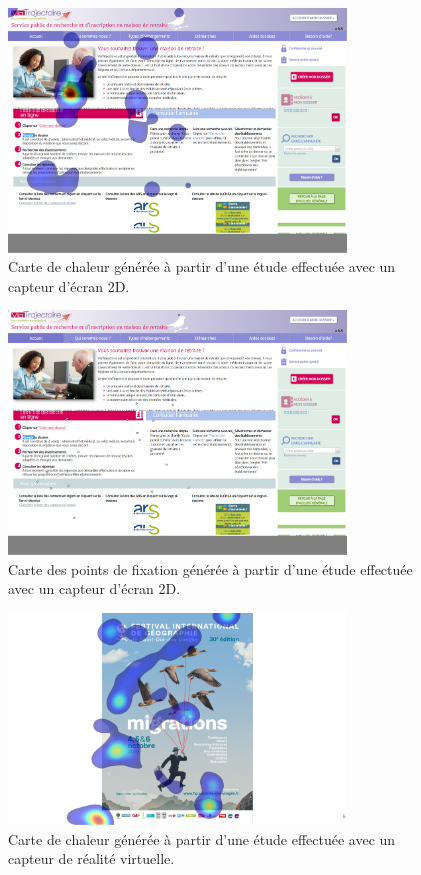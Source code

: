 \documentclass[hidelinks,12pt]{article}
\begin{document}
\begin{figure}[htpb]
  \centering
  \includegraphics[width=0.8\textwidth,keepaspectratio=true]{tea-heatmap-9.png}
  \caption{Carte de chaleur générée à partir d'une étude effectuée avec un
    capteur d'écran 2D.}
  \label{fig:tea-resultats-heatmap}
\end{figure}

\begin{figure}[htpb]
  \centering
  \includegraphics[width=0.8\textwidth,keepaspectratio=true]{tea-raw-9.png}
  \caption{Carte des points de fixation générée à partir d'une étude effectuée
    avec un capteur d'écran 2D.}
  \label{fig:tea-resultats-raw}
\end{figure}

\begin{figure}[htpb]
  \centering
  \includegraphics[width=0.8\textwidth,keepaspectratio=true]{vr-heatmap-0.png}
  \caption{Carte de chaleur générée à partir d'une étude effectuée avec un
    capteur de réalité virtuelle.}
  \label{fig:vr-resultats-heatmap}
\end{figure}
\end{document}
